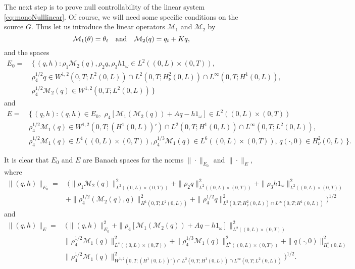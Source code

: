 \documentclass[10pt]{article}
\def\om{\omega}
\def\\Phivec{\mathbf{\Phi}}
\begin{document}
	The next step is to prove null controllability of the linear system \eqref{eq:monoNulllinear}.
	Of course, we will need some specific conditions on the source $G$.
	Thus let us introduce the linear operators $\mathcal{M}_1$ and $\mathcal{M}_2$ by
\begin{equation}\label{Ls}
	\mathcal{M}_1(\theta)= \theta_{t}
	\quad
	\hbox{and}
	\quad
	\mathcal{M}_2(q)= q_{t}+ Kq,
\end{equation}
	and the spaces
\begin{align*}
	E_0
		=&~ \{\, (q,h): \rho_1\mathcal{M}_2(q), \rho_2 q,\rho_3h1_\om\in L^2((0,L)\times(0,T)),\\
		& \ \rho_4^{1/2} q \in W^{1,2}(0,T;L^2(0,L))\cap L^2(0,T;H^2_\nu(0,L))\cap L^{\infty}(0,T;H^1(0,L)),\\
		 & \ \rho_4^{1/2}\mathcal{M}_2(q)\in W^{1,2}(0,T;L^2(0,L))\,\}
\end{align*}
	and
\begin{align*}
	E  =&~ \{\, (q,h): (q,h) \in E_0,\,\,	 								
		\rho_4[\mathcal{M}_1(\mathcal{M}_2(q)) + Aq - h1_{\omega}]\in L^2((0,L)\times(0,T))\\
		& \ \rho_4^{1/2} \mathcal{M}_1(q) \in W^{1,2}(0,T;(H^1(0,L))')\cap  L^2(0,T;H^1(0,L))\cap  L^\infty(0,T;L^2(0,L)),\\
		& \ \rho_4^{1/2} \mathcal{M}_1(q) \in L^4((0,L)\times(0,T)), \rho_4^{1/3} \mathcal{M}_1(q) \in L^6((0,L)\times(0,T)),
		\,  q(\cdot,0)\in H^2_\nu(0,L)\,\}.
\end{align*}

	It is clear that $E_0$ and $E$ are Banach spaces for the norms $\|\cdot\|_{E_0}$ and $\|\cdot\|_{E}$, where
\begin{align*}
	\|(q,h)\|_{E_0} =&~ \bigl(\|\rho_1\mathcal{M}_2(q)\|^2_{L^2((0,L)\times(0,T))} +\|\rho_2q\|^2_{L^2((0,L)\times(0,T))}
	+\|\rho_3h1_\om\|^2_{L^2((0,L)\times(0,T))}\\
	&+\|\rho_4^{1/2}(\mathcal{M}_2(q),q)\|^2_{H^1(0,T;L^2(0,L))}	
	+ \|\rho_4^{1/2} q\|^2_{ L^2(0,T;H^2_\nu(0,L))\cap L^{\infty}(0,T;H^1(0,L))}   )^{1/2}
\end{align*}
	and
\begin{align*}
 	\|(q,h)\|_{E}= &~\bigl(\|(q,h)\|^2_{E_0} +\|\rho_4[\mathcal{M}_1(\mathcal{M}_2(q)) + Aq - h1_{\omega}]\|^2_{L^2((0,L)\times(0,T))}\\
	& \|\rho_4^{1/2} \mathcal{M}_1(q)\|^2_{L^4((0,L)\times(0,T))}   + \|\rho_4^{1/3} \mathcal{M}_1(q)\|^2_{L^6((0,L)\times(0,T))} +
	\|q(\cdot,0)\|^2_{H^2_\nu(0,L)} \\
	&\|\rho_4^{1/2} \mathcal{M}_1(q)\|^2_{W^{1,2}(0,T;(H^1(0,L))')\cap  L^2(0,T;H^1(0,L))\cap  L^\infty(0,T;L^2(0,L))}
	)^{1/2}.
\end{align*}
\end{document}
